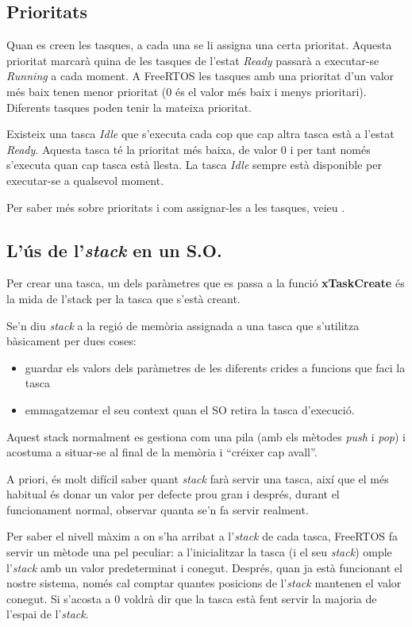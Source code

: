 \subsection{Prioritats}

Quan es creen les tasques, a cada una se li assigna una certa prioritat. Aquesta prioritat marcarà quina de les tasques de l'estat {\em Ready} passarà a executar-se {\em Running} a cada moment. A \gls{FreeRTOS} les tasques amb una prioritat d'un valor més baix tenen menor prioritat (0 és el valor més baix i menys prioritari). Diferents tasques poden tenir la mateixa prioritat.

Existeix una tasca {\em Idle} que s'executa cada cop que cap altra tasca està a l'estat {\em Ready}. Aquesta tasca té la prioritat més baixa, de valor 0 i per tant només s'executa quan cap tasca està llesta. La tasca {\em Idle} sempre està disponible per executar-se a qualsevol moment.

Per saber més sobre prioritats i com assignar-les a les tasques, veieu .
\subsection{L'ús de l'{\em stack} en un S.O.}
\label{sub:StackOS}
Per crear una tasca, un dels paràmetres que es passa a la funció {\bf xTaskCreate} és la mida de l'\gls{stack} per la tasca que s'està creant.

Se'n diu {\em stack} a la regió de memòria assignada a una tasca que s'utilitza bàsicament per dues coses:
\begin{itemize}
 \item guardar els valors dels paràmetres de les diferents crides a funcions que faci la tasca
 \item emmagatzemar el seu context quan el SO retira la tasca d'execució.
\end{itemize}

Aquest \gls{stack} normalment es gestiona com una pila (amb els mètodes {\em push} i {\em pop}) i acostuma a situar-se al final de la memòria i “créixer cap avall”.

A priori, és molt difícil saber quant {\em stack} farà servir una tasca, així que el més habitual és donar un valor per defecte prou gran i després, durant el funcionament normal, observar quanta se'n fa servir realment.

Per saber el nivell màxim a on s'ha arribat a l'{\em stack} de cada tasca, FreeRTOS fa servir un mètode una pel peculiar: a l'inicialitzar la tasca (i el seu {\em stack}) omple l'{\em stack} amb un valor predeterminat i conegut. Després, quan ja està funcionant el nostre sistema, només cal comptar quantes posicions de l'{\em stack} mantenen el valor conegut. Si s'acosta a 0 voldrà dir que la tasca està fent servir la majoria de l'espai de l'{\em stack}.

